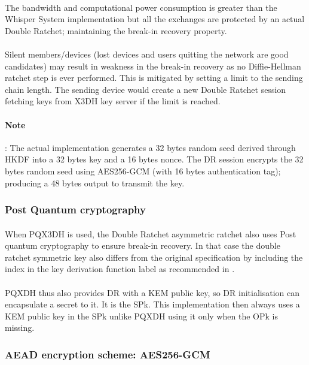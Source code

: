 \documentclass[a4paper,11pt]{article}
\begin{document}
    \paragraph{}The bandwidth and computational power consumption is greater than the Whisper System implementation but all the exchanges are protected by an actual Double Ratchet; maintaining the break-in recovery property.
    \paragraph{}Silent members/devices (lost devices and users quitting the network are good candidates) may result in weakness in the break-in recovery as no Diffie-Hellman ratchet step is ever performed. This is mitigated by setting a limit to the sending chain length. The sending device would create a new Double Ratchet session fetching keys from X3DH key server if the limit is reached.
    \paragraph{Note}: The actual implementation generates a 32 bytes random seed derived through HKDF\cite{rfc5869} into a 32 bytes key and a 16 bytes nonce. The DR session encrypts the 32 bytes random seed using AES256-GCM (with 16 bytes authentication tag); producing a 48 bytes output to transmit the key.
    \subsubsection{Post Quantum cryptography}
    \paragraph*{}When PQX3DH is used, the Double Ratchet asymmetric ratchet also uses Post quantum cryptography to ensure break-in recovery. In that case the double ratchet symmetric key also differs from the original specification by including the index in the key derivation function label as recommended in \cite[section 4.2]{secsymmratchet}.
    \paragraph*{}PQXDH thus also provides DR with a KEM public key, so DR initialisation can encapsulate a secret to it. It is the SPk. This implementation then always uses a KEM public key in the SPk unlike PQXDH using it only when the OPk is missing.

  \subsubsection{AEAD encryption scheme: AES256-GCM}
\end{document}
